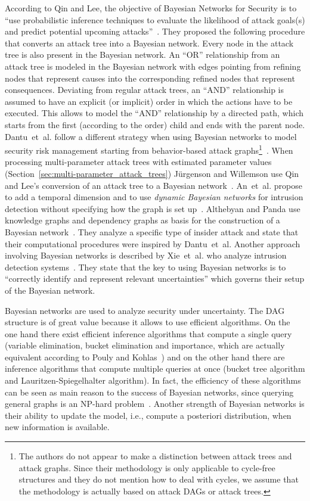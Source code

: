 \documentclass[a4paper]{article}
\begin{document}
According to Qin and Lee, the objective of Bayesian Networks for Security is to
``use probabilistic inference techniques to evaluate the likelihood of attack
goals(s) and predict potential upcoming attacks''~\cite{QiLe}. They proposed the
following procedure that converts an attack tree into a Bayesian network. Every
node in the attack tree is also present in the Bayesian network. An ``OR''
relationship from an attack tree is modeled in the Bayesian network with  edges
pointing from refining nodes that represent causes into the corresponding 
refined nodes that represent consequences. Deviating from regular attack trees,
an ``AND'' relationship is assumed to have an explicit (or implicit) order in
which the actions have to be executed. This allows to model the ``AND'' 
relationship by a directed path, which starts from the first (according to the 
order) child and ends with the parent node. Dantu~et~al. follow a different 
strategy when using Bayesian networks to model security risk management 
starting from behavior-based attack graphs\footnote{The authors do not appear to
make a distinction between attack trees and attack graphs. Since their
methodology is only applicable to cycle-free structures and they do not mention
how to deal with cycles, we assume that the methodology is actually based on
attack DAGs or attack trees.}~\cite{DaKaKo,DaKo,DaKoAkLo,DaKoCa}. When
processing multi-parameter attack trees with estimated parameter values
(Section~\ref{sec:multi-parameter_attack_trees}) J\"{u}rgenson and Willemson use
Qin and Lee's conversion of an attack tree to a Bayesian network~\cite{JuWi}.
An~et~al. propose to add a temporal dimension and to use \emph{dynamic Bayesian
networks} for intrusion detection without specifying how the graph is set
up~\cite{AnJuCe}.  Althebyan and Panda use knowledge graphs and dependency
graphs as basis for the construction of a Bayesian network~\cite{AlPa}. They
analyze a specific type of insider attack and state that their computational
procedures were inspired by Dantu~et~al. Another approach involving Bayesian
networks is described by Xie~et~al. who analyze intrusion detection
systems~\cite{XiLiOuLiLe}. They state that the key to using Bayesian networks is
to ``correctly identify and represent relevant uncertainties'' which governs
their setup of the Bayesian network. 

Bayesian networks are used to analyze security under uncertainty. The DAG
structure is of great value because it allows to use efficient algorithms. On
the one hand there exist efficient inference algorithms that compute a single
query (variable elimination, bucket elimination and importance, which are
actually equivalent according to Pouly and Kohlas~\cite{PoKo}) and on the other
hand there are inference algorithms that compute multiple queries at once
(bucket tree algorithm and Lauritzen-Spiegelhalter algorithm). In fact, the
efficiency of these algorithms can be seen as main reason to the success of
Bayesian networks, since querying general graphs is an NP-hard
problem~\cite{Arnb,Bodl}. Another strength of Bayesian networks is their ability
to update the model, i.e., compute a posteriori distribution, when new 
information is available.
\end{document}
